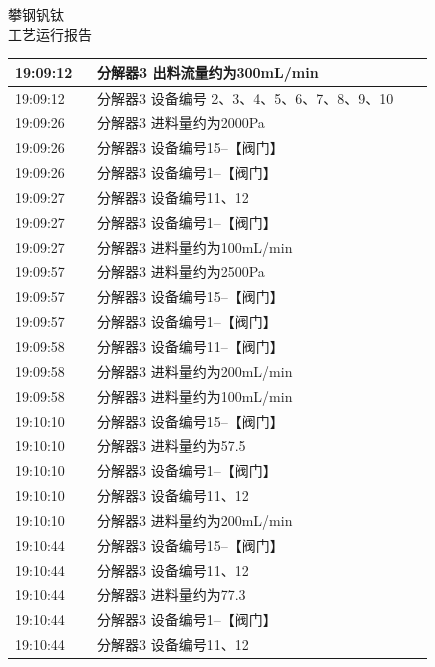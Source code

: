 \documentclass[UTF8,10pt,a4paper,fontset=fandol]{ctexart}
\begin{document}
\vspace{8mm}

\noindent
\begin{minipage}[t]{0.48\linewidth}
\centering
{\small 攀钢钒钛}\\[-1mm]
工艺运行报告

\vspace{2mm}
{\scriptsize
\begin{tabular}{|p{0.18\linewidth}|p{0.74\linewidth}|}
\hline
19:09:12 & 分解器3 出料流量约为300mL/min \\ \hline
19:09:12 & 分解器3 设备编号 2、3、4、5、6、7、8、9、10 \\ \hline
19:09:26 & 分解器3 进料量约为2000Pa \\ \hline
19:09:26 & 分解器3 设备编号15--【阀门】 \\ \hline
19:09:26 & 分解器3 设备编号1--【阀门】 \\ \hline
19:09:27 & 分解器3 设备编号11、12 \\ \hline
19:09:27 & 分解器3 设备编号1--【阀门】 \\ \hline
19:09:27 & 分解器3 进料量约为100mL/min \\ \hline
19:09:57 & 分解器3 进料量约为2500Pa \\ \hline
19:09:57 & 分解器3 设备编号15--【阀门】 \\ \hline
19:09:57 & 分解器3 设备编号1--【阀门】 \\ \hline
19:09:58 & 分解器3 设备编号11--【阀门】 \\ \hline
19:09:58 & 分解器3 进料量约为200mL/min \\ \hline
19:09:58 & 分解器3 进料量约为100mL/min \\ \hline
19:10:10 & 分解器3 设备编号15--【阀门】 \\ \hline
19:10:10 & 分解器3 进料量约为57.5 \\ \hline
19:10:10 & 分解器3 设备编号1--【阀门】 \\ \hline
19:10:10 & 分解器3 设备编号11、12 \\ \hline
19:10:10 & 分解器3 进料量约为200mL/min \\ \hline
19:10:44 & 分解器3 设备编号15--【阀门】 \\ \hline
19:10:44 & 分解器3 设备编号11、12 \\ \hline
19:10:44 & 分解器3 进料量约为77.3 \\ \hline
19:10:44 & 分解器3 设备编号1--【阀门】 \\ \hline
19:10:44 & 分解器3 设备编号11、12 \\ \hline
\end{tabular}}
\end{minipage}
\end{document}
